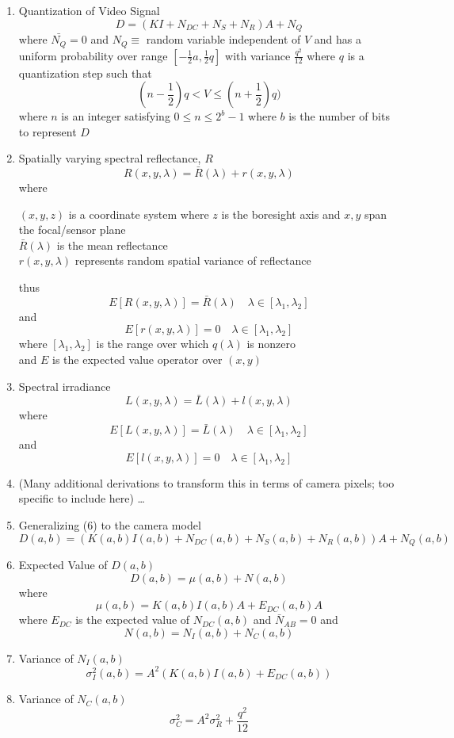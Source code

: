 \begin{enumerate}
    \item Quantization of Video Signal\cite{radiometric_ccd_camera_calibration} 
    \[ D = (KI + N_{DC} + N_{S} + N_{R})A + N_{Q} \]
    where $\bar{N_{Q}}=0$ and $N_{Q} \equiv$ random variable independent of $V$ and has a uniform probability over range $[-\frac{1}{2}a, \frac{1}{2}q]$ with variance $\frac{q^2}{12}$ where $q$ is a quantization step such that 
    \[ (n - \frac{1}{2})q < V \le (n + \frac{1}{2})q) \] 
    where $n$ is an integer satisfying $0 \le n \le 2^b - 1$ where $b$ is the number of bits to represent $D$

    \item Spatially varying spectral reflectance, $R$
    \[ R(x,y,\lambda) = \bar{R}(\lambda) + r(x,y,\lambda) \]
    where\\
    \begin{center}
        $(x,y,z)$ is a coordinate system where $z$ is the boresight axis and $x,y$ span the focal/sensor plane\\
        $\bar{R}(\lambda)$ is the mean reflectance \\
        $r(x,y,\lambda)$ represents random spatial variance of reflectance 
    \end{center}
    thus
    \[ E[R(x,y,\lambda)] = \bar{R}(\lambda) \quad \lambda \in [\lambda_{1}, \lambda_{2}] \]
    and
    \[ E[r(x,y,\lambda)] = 0 \quad \lambda \in [\lambda_{1}, \lambda_{2}] \]
    where $[\lambda_{1}, \lambda_{2}]$ is the range over which $q(\lambda)$ is nonzero\\
    and $E$ is the expected value operator over $(x,y)$

    \item Spectral irradiance \cite{radiometric_ccd_camera_calibration}
    \[ L(x,y,\lambda) = \bar{L}(\lambda) + l(x,y,\lambda) \]
    where
    \[ E[L(x,y,\lambda)] = \bar{L}(\lambda) \quad \lambda \in [\lambda_{1}, \lambda_{2}] \]
    and
    \[ E[l(x,y,\lambda)] = 0 \quad \lambda \in [\lambda_{1}, \lambda_{2}] \]

    \item (Many additional derivations to transform this in terms of camera pixels; too specific to include here) \dots
    \item Generalizing (6) to the camera model
    \[ D(a,b) = (K(a,b)I(a,b) + N_{DC}(a,b) + N_{S}(a,b) + N_{R}(a,b))A + N_{Q}(a,b) \]

    \item Expected Value of $D(a,b)$
    \[ D(a,b) = \mu(a,b) + N(a,b) \]
    where
    \[ \mu(a,b) = K(a,b)I(a,b)A + E_{DC}(a,b)A \]
    where $E_{DC}$ is the expected value of $N_{DC}(a,b)$ and $\bar{N}_{AB} = 0$ and 
    \[ N(a,b) = N_{I}(a,b) + N_{C}(a,b) \]
    
    \item Variance of $N_{I}(a,b)$
    \[ \sigma_{I}^2(a,b) = A^2(K(a,b)I(a,b) + E_{DC}(a,b)) \]

    \item Variance of $N_{C}(a,b)$
    \[ \sigma_{C}^2 = A^2\sigma_{R}^2 + \frac{q^2}{12} \]

\end{enumerate}

